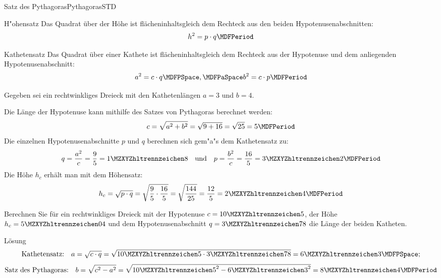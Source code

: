 \begin{MXContent}{Satz des Pythagoras}{Pythagoras}{STD}
\begin{MCOSHZusatz}
\begin{MXInfo}{H"ohensatz}
Das Quadrat \"uber der H\"ohe ist fl\"acheninhaltsgleich dem Rechteck aus 
den beiden Hypotenusenabschnitten: 
\[h^2 = p\cdot q \MDFPeriod\]	
\end{MXInfo}

\begin{MXInfo}{Kathetensatz}
Das Quadrat \"uber einer Kathete ist fl\"acheninhaltsgleich dem Rechteck aus 
der Hypotenuse und dem anliegenden Hypotenusenabschnitt: 
\[a^2 = c\cdot q \MDFPSpace, \MDFPaSpace b^2=c\cdot p \MDFPeriod\]
\end{MXInfo}

\begin{MExample}
Gegeben sei ein rechtwinkliges Dreieck mit den Kathetenl\"angen $a=3$ und 
$b=4$.

Die L\"ange der Hypotenuse kann mithilfe des Satzes von Pythagoras berechnet 
werden:
\[
c = \sqrt{a^2 + b^2}=\sqrt{9 + 16}=\sqrt{25}=5 \MDFPeriod %
\]
Die einzelnen Hypotenusenabschnitte $p$ und $q$ berechnen sich gem"a"s dem 
Kathetensatz zu:
\[
q=\frac{a^2}{c}=\frac{9}{5} = \MZahl{1}{8} \quad \text{und} \quad 
p=\frac{b^2}{c}=\frac{16}{5} = \MZahl{3}{2} \MDFPeriod
\]
Die H\"ohe $h_c$ erh\"alt man mit dem H\"ohensatz:
\[
h_c=\sqrt{p\cdot q}=\sqrt{\frac{9}{5}\cdot\frac{16}{5}} %
=\sqrt{\frac{144}{25}}=\frac{12}{5} = \MZahl{2}{4} \MDFPeriod\]
\end{MExample}

\begin{MExercise}
Berechnen Sie f\"ur ein rechtwinkliges Dreieck mit der Hypotenuse $c=\MZahl{10}{5}$, der H\"ohe $h_c=\MZahl{5}{04}$ und dem Hypotenusenabschnitt $q=\MZahl{3}{78}$ die L\"ange der beiden Katheten.

\begin{MHint}{L\"osung}
\[\text{Kathetensatz:} \quad a=\sqrt{c\cdot q}=\sqrt{\MZahl{10}{5} \cdot \MZahl{3}{78}}=\MZahl{6}{3} \MDFPSpace;\]
\[\text{Satz des Pythagoras:} \quad b=\sqrt{c^2-a^2} = \sqrt{{\MZahl{10}{5}}^2-{\MZahl{6}{3}}^2}=\MZahl{8}{4} \MDFPeriod\]
\end{MHint}
\end{MExercise}
\end{MCOSHZusatz}

\end{MXContent}


